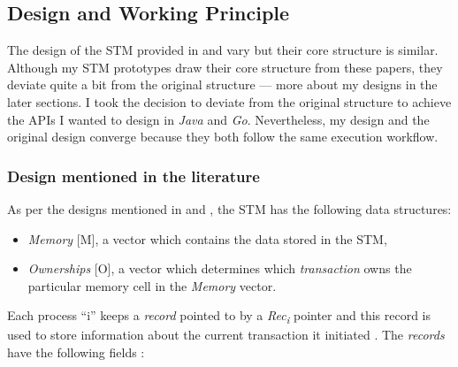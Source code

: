 \documentclass[../main]{subfiles}
\begin{document}
  \subsection{Design and Working Principle}

  \par
  The design of the STM provided in \cite{Shavit1997} and \cite{weimerskirch2008software} vary but their core structure is similar. Although my STM prototypes draw their core structure from these papers, they deviate quite a bit from the original structure --- more about my designs in the later sections. I took the decision to deviate from the original structure to achieve the APIs I wanted to design in {\em Java} and {\em Go}. Nevertheless, my design and the original design converge because they both follow the same execution workflow. \par

  \subsubsection{Design mentioned in the literature}

  \par
  As per the designs mentioned in \cite{Shavit1997} and \cite{weimerskirch2008software}, the STM has the following data structures:

  \begin{itemize}

    \item {\em Memory} [M], a vector which contains the data stored in the STM,

    \item {\em Ownerships} [O], a vector which determines which {\em transaction} owns the particular memory cell in the {\em Memory} vector.
  \end{itemize}

  \par
  Each process ``i'' keeps a {\em record} pointed to by a {\em Rec\textsubscript{i}} pointer and this record is used to store information about the current transaction it initiated \cite{Shavit1997}\cite{weimerskirch2008software}. The {\em records} have the following fields \cite{Shavit1997}\cite{weimerskirch2008software}: \par
\end{document}
